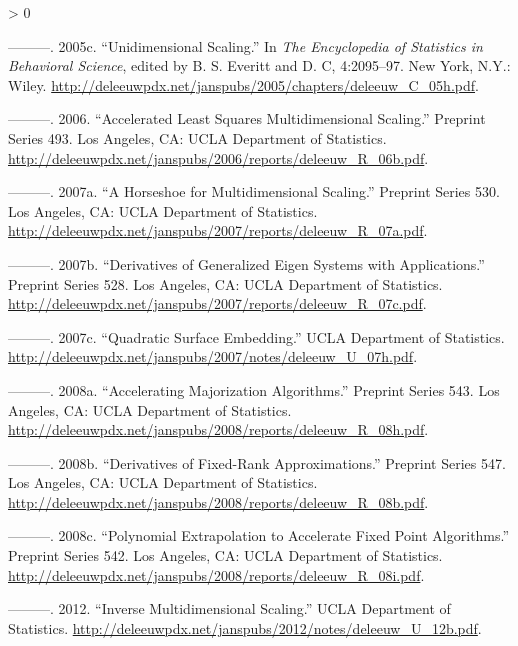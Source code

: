 \documentclass[
  12pt,
]{book}
\newlength{\cslhangindent}
\newenvironment{CSLReferences}[2] %
 {%
  \setlength{\parindent}{0pt}
  \ifodd #1 \everypar{\setlength{\hangindent}{\cslhangindent}}\ignorespaces\fi
  \ifnum #2 > 0
  \setlength{\parskip}{#2\baselineskip}
  \fi
 }%
 {}
\theoremstyle{definition}
\theoremstyle{definition}
\theoremstyle{definition}
\theoremstyle{definition}
\theoremstyle{remark}
\begin{document}
\begin{CSLReferences}{1}{0}
\leavevmode\hypertarget{ref-deleeuw_C_05h}{}%
---------. 2005c. {``{Unidimensional Scaling}.''} In \emph{The Encyclopedia of Statistics in Behavioral Science}, edited by B. S. Everitt and D. C, 4:2095--97. New York, N.Y.: Wiley. \url{http://deleeuwpdx.net/janspubs/2005/chapters/deleeuw_C_05h.pdf}.

\leavevmode\hypertarget{ref-deleeuw_R_06b}{}%
---------. 2006. {``{Accelerated Least Squares Multidimensional Scaling}.''} Preprint Series 493. Los Angeles, CA: UCLA Department of Statistics. \url{http://deleeuwpdx.net/janspubs/2006/reports/deleeuw_R_06b.pdf}.

\leavevmode\hypertarget{ref-deleeuw_R_07a}{}%
---------. 2007a. {``{A Horseshoe for Multidimensional Scaling}.''} Preprint Series 530. Los Angeles, CA: UCLA Department of Statistics. \url{http://deleeuwpdx.net/janspubs/2007/reports/deleeuw_R_07a.pdf}.

\leavevmode\hypertarget{ref-deleeuw_R_07c}{}%
---------. 2007b. {``Derivatives of Generalized Eigen Systems with Applications.''} Preprint Series 528. Los Angeles, CA: UCLA Department of Statistics. \url{http://deleeuwpdx.net/janspubs/2007/reports/deleeuw_R_07c.pdf}.

\leavevmode\hypertarget{ref-deleeuw_U_07h}{}%
---------. 2007c. {``{Quadratic Surface Embedding}.''} UCLA Department of Statistics. \url{http://deleeuwpdx.net/janspubs/2007/notes/deleeuw_U_07h.pdf}.

\leavevmode\hypertarget{ref-deleeuw_R_08h}{}%
---------. 2008a. {``Accelerating Majorization Algorithms.''} Preprint Series 543. Los Angeles, CA: UCLA Department of Statistics. \url{http://deleeuwpdx.net/janspubs/2008/reports/deleeuw_R_08h.pdf}.

\leavevmode\hypertarget{ref-deleeuw_R_08b}{}%
---------. 2008b. {``{Derivatives of Fixed-Rank Approximations}.''} Preprint Series 547. Los Angeles, CA: UCLA Department of Statistics. \url{http://deleeuwpdx.net/janspubs/2008/reports/deleeuw_R_08b.pdf}.

\leavevmode\hypertarget{ref-deleeuw_R_08i}{}%
---------. 2008c. {``Polynomial Extrapolation to Accelerate Fixed Point Algorithms.''} Preprint Series 542. Los Angeles, CA: UCLA Department of Statistics. \url{http://deleeuwpdx.net/janspubs/2008/reports/deleeuw_R_08i.pdf}.

\leavevmode\hypertarget{ref-deleeuw_U_12b}{}%
---------. 2012. {``{Inverse Multidimensional Scaling}.''} UCLA Department of Statistics. \url{http://deleeuwpdx.net/janspubs/2012/notes/deleeuw_U_12b.pdf}.


\end{CSLReferences}
\end{document}
